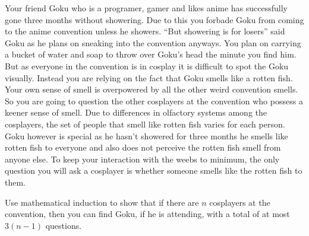 \documentclass[a4paper]{exam}
\begin{document}
\begin{questions}
   Your friend Goku who is a programer, gamer and likes anime has successfully gone three months without showering. Due to this you forbade Goku from coming to the anime convention unless he showers. ``But showering is for losers'' said Goku as he plans on sneaking into the convention anyways. You plan on carrying a bucket of water and soap to throw over Goku's head the minute you find him. But as everyone in the convention is in cosplay it is difficult to spot the Goku visually. Instead you are relying on the fact that Goku smells like a rotten fish. Your own sense of smell is overpowered by all the other weird convention smells. So you are going to question the other cosplayers at the convention who possess a keener sense of smell. Due to differences in olfactory systems among the cosplayers, the set of people that smell like rotten fish varies for each person. Goku however is special as he hasn't showered for three months he smells like rotten fish to everyone and also does not perceive the rotten fish smell from anyone else. To keep your interaction with the weebs to minimum, the only question you will ask a cosplayer is whether someone smells like the rotten fish to them.
  
  Use mathematical induction to show that if there are $n$ cosplayers at the convention, then you can find Goku, if he is attending, with a total of at most $3(n - 1)$ questions.
  
  \begin{figure}[h!]
    \centering
\end{figure}
\end{questions}
\end{document}
